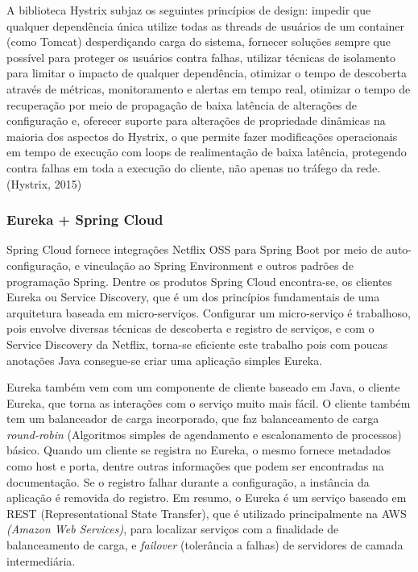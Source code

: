 \documentclass[journal]{IEEEtran}
\begin{document}
A biblioteca Hystrix subjaz os seguintes princípios de design: impedir que qualquer dependência única utilize todas as threads de usuários de um container (como Tomcat) desperdiçando carga do sistema, fornecer soluções sempre que possível para proteger os usuários contra falhas, utilizar técnicas de isolamento para limitar o impacto de qualquer dependência, otimizar o tempo de descoberta através de métricas, monitoramento e alertas em tempo real, otimizar o tempo de recuperação por meio de propagação de baixa latência de alterações de configuração e, oferecer suporte para alterações de propriedade dinâmicas na maioria dos aspectos do Hystrix, o que permite fazer modificações operacionais em tempo de execução com loops de realimentação de baixa latência, protegendo contra falhas em toda a execução do cliente, não apenas no tráfego da rede. (Hystrix, 2015)

\subsubsection{Eureka + Spring Cloud}
Spring Cloud fornece integrações Netflix OSS para Spring Boot por meio de auto-configuração, e vinculação ao Spring Environment e outros padrões de programação Spring. Dentre os produtos Spring Cloud encontra-se, os clientes Eureka ou Service Discovery, que é um dos princípios fundamentais de uma arquitetura baseada em micro-serviços. Configurar um micro-serviço é trabalhoso, pois envolve diversas técnicas de descoberta e registro de serviços, e com o Service Discovery da Netflix, torna-se eficiente este trabalho pois com poucas anotações Java consegue-se criar uma aplicação simples Eureka. 

Eureka também vem com um componente de cliente baseado em Java, o cliente Eureka, que torna as interações com o serviço muito mais fácil. O cliente também tem um balanceador de carga incorporado, que faz balanceamento de carga \emph{round-robin} (Algoritmos simples de agendamento e escalonamento de processos) básico. Quando um cliente se registra no Eureka, o mesmo fornece metadados como host e porta, dentre outras informações que podem ser encontradas na documentação. Se o registro falhar durante a configuração, a instância da aplicação é removida do registro. Em resumo, o Eureka é um serviço baseado em REST (Representational State Transfer), que é utilizado principalmente na AWS \emph{(Amazon Web Services)}, para localizar serviços com a finalidade de balanceamento de carga, e \emph{failover} (tolerância a falhas) de servidores de camada intermediária. 
\end{document}
